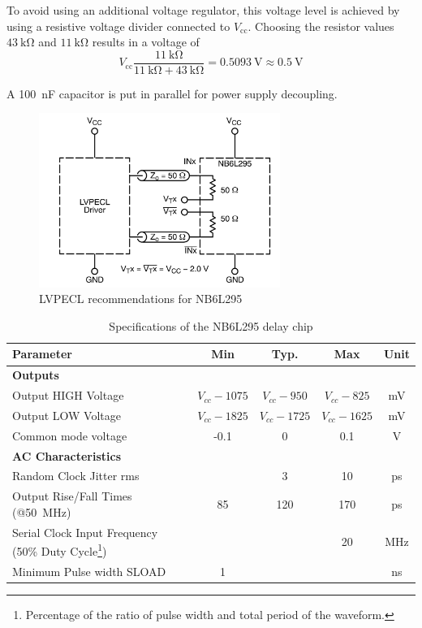 To avoid using an additional voltage regulator, this voltage level is achieved by using a resistive voltage divider connected to $V_\text{cc}$.
Choosing the resistor values $\SI{43}{\kilo\ohm}$ and $\SI{11}{\kilo\ohm}$ results in a voltage of
\begin{equation}
	V_\text{cc} \frac{\SI{11}{\kilo\ohm}}{\SI{11}{\kilo\ohm} + \SI{43}{\kilo\ohm}} = \SI{0.5093}{\volt} \approx \SI{0.5}{\volt}
\end{equation}

A \SI{100}{\nano\farad} capacitor is put in parallel for power supply decoupling.

\begin{figure}[tbh]
	\centering
	\includegraphics[width = 0.7\textwidth]{chap/04-work/img/delay_lvpecl}
	\caption[NB6L295 Delay Chip Schematic]{LVPECL recommendations for NB6L295 \cite{NB6L295}}
	\label{fig:delay_lvpecl}
\end{figure}


\begin{table}[tbh]
	\caption[NB6L295 Characteristics]{Specifications of the NB6L295 delay chip \cite{NB6L295}}
	\label{tab:nb6l295}
	\begin{minipage}{\textwidth}
		\centering
		\begin{tabularx}{\textwidth}{Xcccc}
			\toprule
			\textbf{Parameter} & \textbf{Min} & \textbf{Typ.} & \textbf{Max} & \textbf{Unit}\\
			\midrule
			\textbf{Outputs} &&&& \\
			Output HIGH Voltage & $V_{cc} - 1075$ & $V_{cc} - 950$ & $V_{cc} - 825$ & mV\\
			Output LOW Voltage & $V_{cc} - 1825$ & $V_{cc} - 1725$ & $V_{cc} - 1625$ & mV\\
			Common mode voltage & -0.1 & 0 & 0.1 & V\\[0.3cm]
			\textbf{AC Characteristics} &&&&\\
			Random Clock Jitter \gls{rms}&  & 3 & 10 & ps\\
			Output Rise/Fall Times (@\SI{50}{\mega \hertz}) & 85 & 120 & 170 & ps\\
			Serial Clock Input Frequency (50\% Duty Cycle\footnote{Percentage of the ratio of pulse width and total period of the waveform.}) &  &  & 20 & MHz\\
			Minimum Pulse width SLOAD  & 1 &  &  & ns\\
			\bottomrule
		\end{tabularx}
	\end{minipage}
\end{table}


